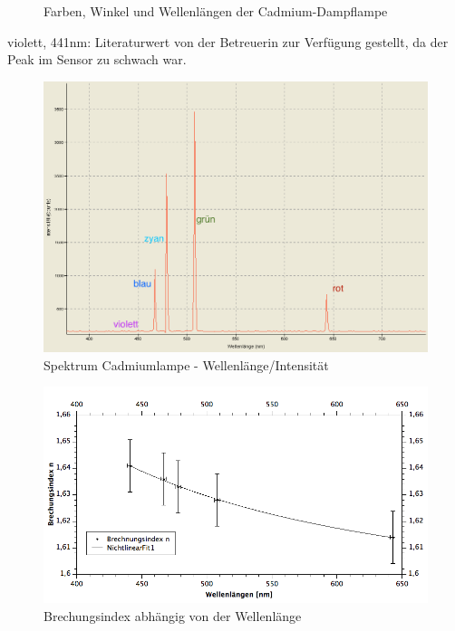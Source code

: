 \documentclass[12pt,a4paper]{article}
\begin{document}
\begin{multicols}{2}
\begin{figure}[H]
{			}
	\caption{Farben, Winkel und Wellenlängen der Cadmium-Dampflampe}
	\label{fig:werte_cadmiumdampflampe}
\end{figure}
violett, 441nm: Literaturwert von der Betreuerin zur Verfügung gestellt, da der Peak im Sensor zu schwach war.



\end{multicols}
\begin{figure}[H]
	\centering
	\includegraphics[scale=0.40]{./figure/Spektrum_Cadmiumdampflampe_PW7_Braun_Kurz.png}
	\caption{Spektrum Cadmiumlampe - Wellenlänge/Intensität}
	\label{fig:prisma_wellenlaenge}
\end{figure}

\begin{figure}[H]
	\centering
	\includegraphics[scale=0.55]{./figure/anfpra7_spektrum_grafik.png}
	\caption{Brechungsindex abhängig von der Wellenlänge}
	\label{fig:wellenlaenge_brechungsindex}
\end{figure}
\end{document}
